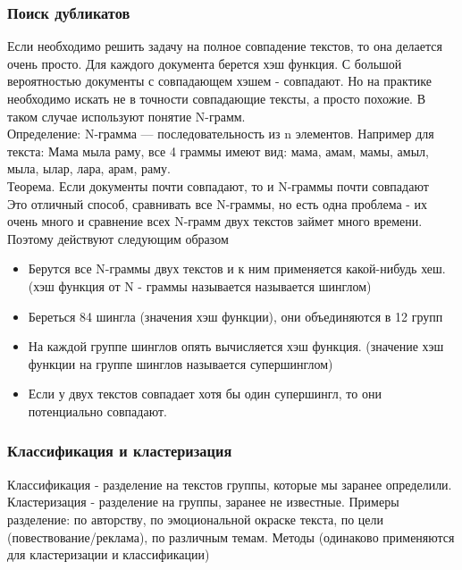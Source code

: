\subsubsection {Поиск дубликатов}
Если необходимо решить задачу на полное совпадение текстов, то она делается очень просто. Для каждого документа берется хэш функция. С большой вероятностью документы с совпадающем хэшем - совпадают. Но на практике необходимо искать не в точности совпадающие тексты, а просто похожие. В таком случае используют понятие N-грамм.  \\
Определение: N-грамма — последовательность из n элементов. Например для текста: Мама мыла раму, все 4 граммы имеют вид: мама, амам, мамы, амыл, мыла, ылар, лара, арам, раму.  \\
Теорема. Если документы почти совпадают, то и N-граммы почти совпадают\\
Это отличный способ, сравнивать все N-граммы, но есть одна проблема - их очень много и сравнение всех N-грамм двух текстов займет много времени. Поэтому действуют следующим образом

\begin {itemize}
\item Берутся все N-граммы двух текстов и к ним применяется какой-нибудь хеш. (хэш функция от N - граммы называется называется шинглом)
\item Береться 84 шингла (значения хэш функции), они объединяются в 12 групп
\item На каждой группе шинглов опять вычисляется хэш функция. (значение хэш функции на группе шинглов называется супершинглом)
\item Если у двух текстов совпадает хотя бы один супершингл,  то они потенциально совпадают.
\end {itemize}

\subsubsection {Классификация и кластеризация}
Классификация - разделение на текстов группы, которые мы заранее определили. Кластеризация - разделение на группы, заранее не известные.
Примеры разделение: по авторству, по эмоциональной окраске текста, по цели (повествование/реклама), по различным темам.
Методы (одинаково применяются для кластеризации и классификации)

